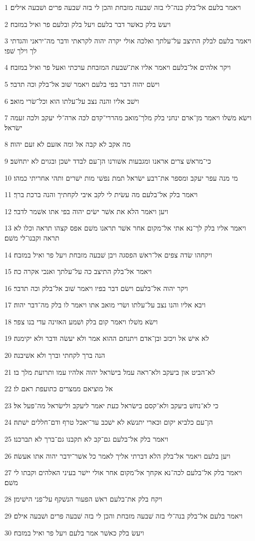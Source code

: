 \par 1 ויאמר בלעם אל־בלק בנה־לי בזה שׁבעה מזבחת והכן לי בזה שׁבעה פרים ושׁבעה אילים׃
\par 2 ויעשׂ בלק כאשׁר דבר בלעם ויעל בלק ובלעם פר ואיל במזבח׃
\par 3 ויאמר בלעם לבלק התיצב על־עלתך ואלכה אולי יקרה יהוה לקראתי ודבר מה־יראני והגדתי לך וילך שׁפי׃
\par 4 ויקר אלהים אל־בלעם ויאמר אליו את־שׁבעת המזבחת ערכתי ואעל פר ואיל במזבח׃
\par 5 וישׂם יהוה דבר בפי בלעם ויאמר שׁוב אל־בלק וכה תדבר׃
\par 6 וישׁב אליו והנה נצב על־עלתו הוא וכל־שׂרי מואב׃
\par 7 וישׂא משׁלו ויאמר מן־ארם ינחני בלק מלך־מואב מהררי־קדם לכה ארה־לי יעקב ולכה זעמה ישׂראל׃
\par 8 מה אקב לא קבה אל ומה אזעם לא זעם יהוה׃
\par 9 כי־מראשׁ צרים אראנו ומגבעות אשׁורנו הן־עם לבדד ישׁכן ובגוים לא יתחשׁב׃
\par 10 מי מנה עפר יעקב ומספר את־רבע ישׂראל תמת נפשׁי מות ישׁרים ותהי אחריתי כמהו׃
\par 11 ויאמר בלק אל־בלעם מה עשׂית לי לקב איבי לקחתיך והנה ברכת ברך׃
\par 12 ויען ויאמר הלא את אשׁר ישׂים יהוה בפי אתו אשׁמר לדבר׃
\par 13 ויאמר אליו בלק לך־נא אתי אל־מקום אחר אשׁר תראנו משׁם אפס קצהו תראה וכלו לא תראה וקבנו־לי משׁם׃
\par 14 ויקחהו שׂדה צפים אל־ראשׁ הפסגה ויבן שׁבעה מזבחת ויעל פר ואיל במזבח׃
\par 15 ויאמר אל־בלק התיצב כה על־עלתך ואנכי אקרה כה׃
\par 16 ויקר יהוה אל־בלעם וישׂם דבר בפיו ויאמר שׁוב אל־בלק וכה תדבר׃
\par 17 ויבא אליו והנו נצב על־עלתו ושׂרי מואב אתו ויאמר לו בלק מה־דבר יהוה׃
\par 18 וישׂא משׁלו ויאמר קום בלק ושׁמע האזינה עדי בנו צפר׃
\par 19 לא אישׁ אל ויכזב ובן־אדם ויתנחם ההוא אמר ולא יעשׂה ודבר ולא יקימנה׃
\par 20 הנה ברך לקחתי וברך ולא אשׁיבנה׃
\par 21 לא־הביט און ביעקב ולא־ראה עמל בישׂראל יהוה אלהיו עמו ותרועת מלך בו׃
\par 22 אל מוציאם ממצרים כתועפת ראם לו׃
\par 23 כי לא־נחשׁ ביעקב ולא־קסם בישׂראל כעת יאמר ליעקב ולישׂראל מה־פעל אל׃
\par 24 הן־עם כלביא יקום וכארי יתנשׂא לא ישׁכב עד־יאכל טרף ודם־חללים ישׁתה׃
\par 25 ויאמר בלק אל־בלעם גם־קב לא תקבנו גם־ברך לא תברכנו׃
\par 26 ויען בלעם ויאמר אל־בלק הלא דברתי אליך לאמר כל אשׁר־ידבר יהוה אתו אעשׂה׃
\par 27 ויאמר בלק אל־בלעם לכה־נא אקחך אל־מקום אחר אולי יישׁר בעיני האלהים וקבתו לי משׁם׃
\par 28 ויקח בלק את־בלעם ראשׁ הפעור הנשׁקף על־פני הישׁימן׃
\par 29 ויאמר בלעם אל־בלק בנה־לי בזה שׁבעה מזבחת והכן לי בזה שׁבעה פרים ושׁבעה אילם׃
\par 30 ויעשׂ בלק כאשׁר אמר בלעם ויעל פר ואיל במזבח׃

